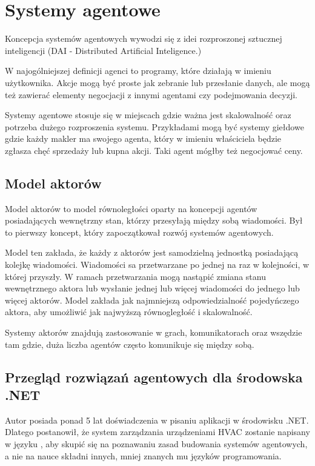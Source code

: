 \chapter{Systemy agentowe}
Koncepcja systemów agentowych wywodzi się z idei rozproszonej sztucznej inteligencji (DAI - Distributed Artificial Inteligence.)

W najogólniejszej definicji agenci to programy, które działają w imieniu użytkownika. Akcje mogą być proste jak zebranie lub przesłanie danych, ale mogą też zawierać elementy negocjacji z innymi agentami czy podejmowania decyzji. \cite{bib:agenciNazewnictwo}

Systemy agentowe stosuje się w miejscach gdzie ważna jest skalowalność oraz potrzeba dużego rozproszenia systemu. Przykładami mogą być systemy giełdowe gdzie każdy makler ma swojego agenta, który w imieniu właściciela będzie zgłasza chęć sprzedaży lub kupna akcji. Taki agent mógłby też negocjować ceny.

\section{Model aktorów}
Model aktorów to model równoległości oparty na koncepcji agentów posiadających wewnętrzny stan, którzy przesyłają między sobą wiadomości.
Był to pierwszy koncept, który zapoczątkował rozwój systemów agentowych.
\cite{bib:agenciNazewnictwo}

Model ten zakłada, że każdy z aktorów jest samodzielną jednostką posiadającą kolejkę wiadomości. Wiadomości sa przetwarzane po jednej na raz w kolejności, w której przyszły. W ramach przetwarzania mogą nastąpić zmiana stanu wewnętrznego aktora lub wysłanie jednej lub więcej wiadomości do jednego lub więcej aktorów. Model zakłada jak najmniejszą odpowiedzialność pojedyńczego aktora, aby umożliwić jak najwyższą równogległość i skalowalność. 

Systemy aktorów znajdują zastosowanie w grach, komunikatorach oraz wszędzie tam gdzie, duża liczba agentów często komunikuje się między sobą. \cite{bib:akkaUseCases}

\section{Przegląd rozwiązań agentowych dla środowska .NET}
Autor posiada ponad 5 lat doświadczenia w pisaniu aplikacji w środowisku .NET. 
Dlatego postanowił, że system zarządzania urządzeniami HVAC zostanie napisany w języku \csh, aby skupić się na poznawaniu zasad budowania systemów agentowych, a nie na nauce składni innych, mniej znanych mu języków programowania. 

